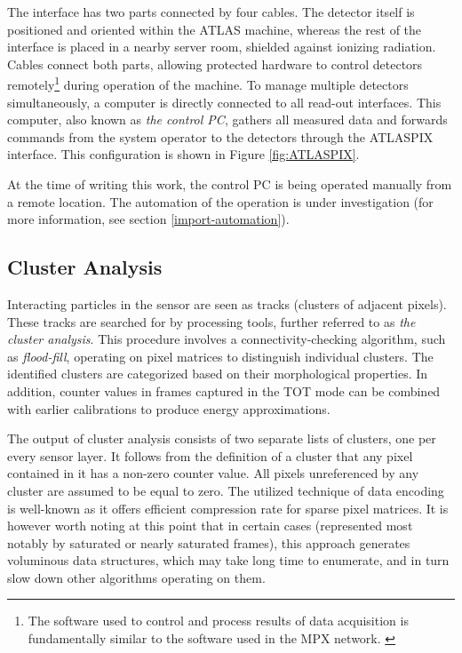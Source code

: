 The interface has two parts connected by four cables. The detector itself is positioned and oriented within the ATLAS machine, whereas the rest of the interface is placed in a nearby server room, shielded against ionizing radiation. Cables connect both parts, allowing protected hardware to control detectors remotely\footnote{The software used to control and process results of data acquisition is fundamentally similar to the software used in the MPX network. \cite{ProcessingSoftware}} during operation of the machine. To manage multiple detectors simultaneously, a computer is directly connected to all read-out interfaces. This computer, also known as \textit{the control PC}, gathers all measured data and forwards commands from the system operator to the detectors through the ATLASPIX interface. This configuration is shown in Figure \ref{fig:ATLASPIX}.

At the time of writing this work, the control PC is being operated manually from a remote location. The automation of the operation is under investigation (for more information, see section \ref{import-automation}).

\subsection{Cluster Analysis}
\label{intro:cluster-analysis}
Interacting particles in the sensor are seen as tracks (clusters of adjacent pixels). These tracks are searched for by processing tools, further referred to as \textit{the cluster analysis}. \cite{PatternRecognition} This procedure involves a connectivity-checking algorithm, such as \textit{flood-fill}, operating on pixel matrices to distinguish individual clusters. The identified clusters are categorized based on their morphological properties. In addition, counter values in frames captured in the TOT mode can be combined with earlier calibrations to produce energy approximations. \cite{EnergyCalibration}

\todo

The output of cluster analysis consists of two separate lists of clusters, one per every sensor layer. It follows from the definition of a cluster that any pixel contained in it has a non-zero counter value. All pixels unreferenced by any cluster are assumed to be equal to zero. The utilized technique of data encoding is well-known as it offers efficient compression rate for sparse pixel matrices. It is however worth noting at this point that in certain cases (represented most notably by saturated or nearly saturated frames), this approach generates voluminous data structures, which may take long time to enumerate, and in turn slow down other algorithms operating on them.

